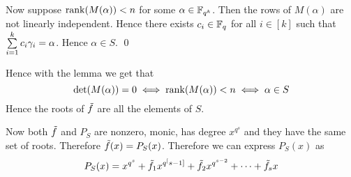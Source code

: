 \documentclass[a4paper, 11pt]{article}
\renewenvironment{proof}{\noindent{\it \textbf{Proof:}}\hspace*{1em}}{\qed\bigskip\\}
\begin{document}
{\begin{proof}
	Now suppose $\rank(M(\alpha))<n$ for some $\alpha\in \mathbb{F}_{q^k}$. Then the rows of $M(\alpha)$ are not linearly independent. Hence there exists $c_i\in \mathbb{F}_q$ for all $i\in[k]$ such that $\sum\limits_{i=1}^kc_i\gamma_i=\alpha$. Hence $\alpha\in S$.
\end{proof}

Hence with the lemma we get that $$\det(M(\alpha))=0\iff \rank(M(\alpha))<n\iff \alpha\in S$$Hence the roots of $\tilde{f}$ are all the elements of $S$. 

Now both $\tilde{f}$ and $P_S$ are nonzero, monic, has degree $x^{q^s}$ and they have the same set of roots. Therefore $\tilde{f}(x)=P_S(x)$. Therefore we can express $P_S(x)$ as $$P_S(x)=x^{q^s}+\tilde{f}_1x^{q^[s-1]}+\tilde{f}_2x^{q^{s-2}}+\cdots +\tilde{f}_sx$$

}
\newpage

\end{document}
